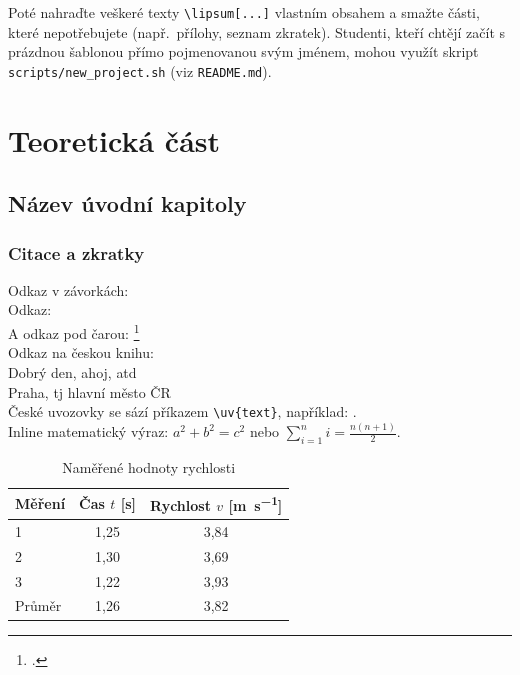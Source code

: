 \documentclass[12pt]{report}
\begin{document}
Poté nahraďte veškeré texty \verb|\lipsum[...]| vlastním obsahem a smažte části,
které nepotřebujete (např.\ přílohy, seznam zkratek). Studenti, kteří chtějí
začít s prázdnou šablonou přímo pojmenovanou svým jménem, mohou využít skript
\texttt{scripts/new\_project.sh} (viz \texttt{README.md}).
	
\part{Teoretická část}  %
	
\chapter{Název úvodní kapitoly}
			
\section{Citace a zkratky}
	Odkaz v závorkách: \parencite[viz][str. 900]{einstein}\\
	Odkaz: \cite{knuthwebsite}\\
	A odkaz pod čarou: \footcite[viz][str. 42]{latexcompanion}\\
	Odkaz na českou knihu: \cite{mareks}\\
	Dobrý den, ahoj, \gls{atd}\\
	Praha, \gls{tj} hlavní město ČR\\
	České uvozovky se sází příkazem \verb|\uv{text}|, například: .\\
	Inline matematický výraz: $a^2 + b^2 = c^2$ nebo $\sum_{i=1}^{n} i = \frac{n(n+1)}{2}$.
	
	\begin{table}[htbp]
		\centering
		\caption{Naměřené hodnoty rychlosti}
		\label{tab:mereni}
		\begin{tabular}{lcc}
			\toprule
			Měření & Čas $t$ [\si{\second}] & Rychlost $v$ [\si{\meter\per\second}] \\
			\midrule
			1 & 1{,}25 & 3{,}84 \\
			2 & 1{,}30 & 3{,}69 \\
			3 & 1{,}22 & 3{,}93 \\
			\midrule
			Průměr & 1{,}26 & 3{,}82 \\
			\bottomrule
		\end{tabular}
	\end{table}
\end{document}
